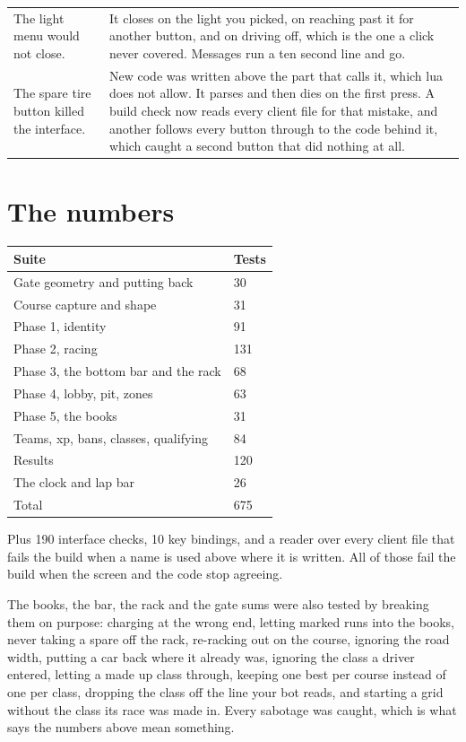 \documentclass[11pt,a4paper]{article}
\begin{document}
\begin{longtable}{@{}>{\raggedright\arraybackslash}p{78mm}>{\raggedright\arraybackslash}p{80mm}@{}}
\addlinespace
The light menu would not close.
& It closes on the light you picked, on reaching past it for another button,
  and on driving off, which is the one a click never covered. Messages run a
  ten second line and go. \\
\addlinespace
The spare tire button killed the interface.
& New code was written above the part that calls it, which lua does not allow.
  It parses and then dies on the first press. A build check now reads every
  client file for that mistake, and another follows every button through to
  the code behind it, which caught a second button that did nothing at all. \\
\bottomrule
\end{longtable}

\section{The numbers}

\begin{longtable}{@{}p{60mm}p{30mm}@{}}
\toprule
\textbf{Suite} & \textbf{Tests} \\
\midrule
\endhead
Gate geometry and putting back & 30 \\
Course capture and shape & 31 \\
Phase 1, identity        & 91 \\
Phase 2, racing          & 131 \\
Phase 3, the bottom bar and the rack & 68 \\
Phase 4, lobby, pit, zones & 63 \\
Phase 5, the books       & 31 \\
Teams, xp, bans, classes, qualifying & 84 \\
Results                  & 120 \\
The clock and lap bar    & 26 \\
\midrule
Total                    & 675 \\
\bottomrule
\end{longtable}

Plus 190 interface checks, 10 key bindings, and a reader over every client
file that fails the build when a name is used above where it is written. All
of those fail the build when the screen and the code stop agreeing.

The books, the bar, the rack and the gate sums were also tested by breaking
them on purpose: charging at the wrong end, letting marked runs into the
books, never taking a spare off the rack, re-racking out on the course,
ignoring the road width, putting a car back where it already was, ignoring
the class a driver entered, letting a made up class through, keeping one best
per course instead of one per class, dropping the class off the line your bot
reads, and starting a grid without the class its race was made in. Every
sabotage was caught, which is what says the numbers above mean something.
\end{document}
